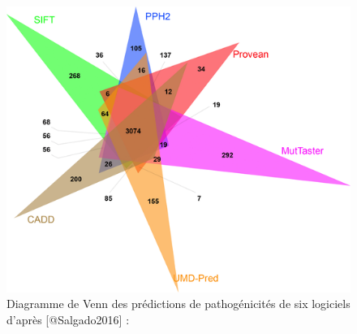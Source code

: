 \documentclass[12pt,twoside]{reedthesis}
\theoremstyle{definition}
\theoremstyle{definition}
\theoremstyle{remark}
\begin{document}
  \begin{figure}
  
  {\centering \includegraphics[scale=.7]{figure/venn_Diag_patho_pred} 
  
  }
  
  \caption[Diagramme de Venn des prédictions de pathogénicités de six logiciels]{Diagramme de Venn des prédictions de pathogénicités de six logiciels d'après [@Salgado2016] : }\label{fig:vennpred}
  \end{figure}
  
\end{document}
